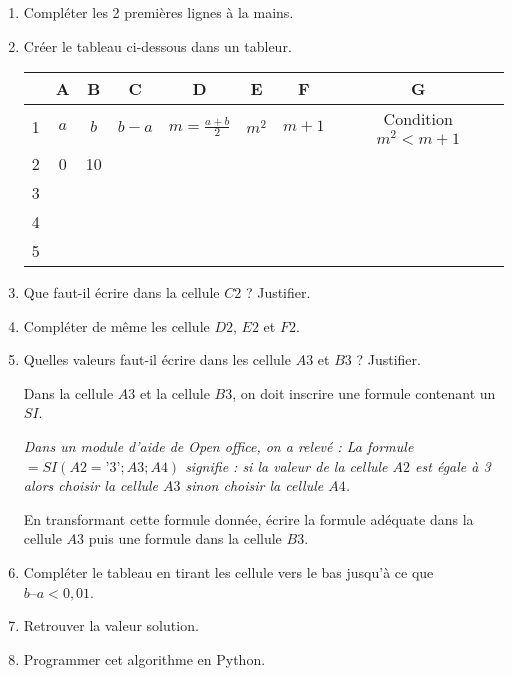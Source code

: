 \begin{enumerate}
\item  Compléter les 2 premières lignes à la mains. 

\item  Créer le tableau ci-dessous dans un tableur.

\begin{tabular}{|c|c|c|c|c|c|c|c|}
\hline 
\rowcolor{gray} & A & B & C & D & E & F & G\\ 
\hline 
\cellcolor{gray} 1 & $a$ & $b$ & $b-a$ & $m=\frac{a+b}{2}$ & $m^2$ & $m+1$ & Condition $m^2<m+1$\\ 
\hline 
\cellcolor{gray}2 & 0 & 10 &  &  &  & &  \\ 
\hline 
\cellcolor{gray}3 &  &  &  &  &  & &  \\
\hline 
\cellcolor{gray}4 &  &  &  &  &  & &  \\
\hline 
\cellcolor{gray}5 &  &  &  &  &  & &  \\
\hline 
\end{tabular} 


\item  Que faut-il écrire dans la cellule $C2$ ? Justifier.
\item  Compléter de même les cellule $D2$, $E2$ et $F2$.
\item  Quelles valeurs faut-il écrire dans les cellule $A3$ et $B3$ ? Justifier.

Dans la cellule $A3$ et la cellule $B3$, on doit inscrire une formule contenant un $SI$.

\textit{Dans un module d'aide de Open office, on a relevé :
La formule $=SI(A2=’3’ ;A3 ;A4)$ signifie : si la valeur de la cellule $A2$ est égale à 3 alors
choisir la cellule $A3$ sinon choisir la cellule $A4$.}

En transformant cette formule donnée, écrire la formule adéquate dans la cellule $A3$ puis une
formule dans la cellule $B3$.

\item  Compléter le tableau en tirant les cellule vers le bas jusqu'à ce que $b – a < 0,01$.
\item  Retrouver la valeur solution.
\item  Programmer cet algorithme en Python.
\end{enumerate}


